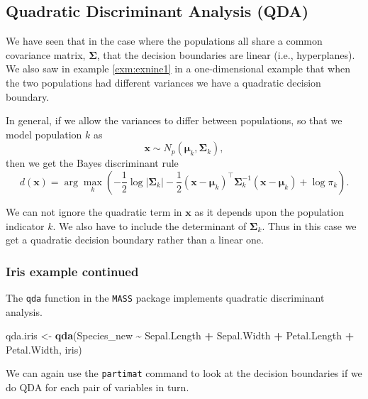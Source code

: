 \documentclass[
]{book}
\newenvironment{Shaded}{\begin{snugshade}}{\end{snugshade}}
\newcommand{\FunctionTok}[1]{\textcolor[rgb]{0.13,0.29,0.53}{\textbf{#1}}}
\newcommand{\NormalTok}[1]{#1}
\newcommand{\OtherTok}[1]{\textcolor[rgb]{0.56,0.35,0.01}{#1}}
\newcommand{\SpecialCharTok}[1]{\textcolor[rgb]{0.81,0.36,0.00}{\textbf{#1}}}
\theoremstyle{definition}
\theoremstyle{definition}
\theoremstyle{definition}
\theoremstyle{definition}
\theoremstyle{remark}
\begin{document}
\hypertarget{quadratic-discriminant-analysis-qda}{%
\subsection{Quadratic Discriminant Analysis (QDA)}\label{quadratic-discriminant-analysis-qda}}

We have seen that in the case where the populations all share a common covariance matrix, \(\boldsymbol{\Sigma}\), that the decision boundaries are linear (i.e., hyperplanes). We also saw in example \ref{exm:exnine1} in a one-dimensional example that when the two populations had different variances we have a quadratic decision boundary.

In general, if we allow the variances to differ between populations, so that we model population \(k\) as \[\mathbf x\sim N_p({\boldsymbol{\mu}}_k, \boldsymbol{\Sigma}_k),\]
then we get the Bayes discriminant rule
\[
d(\mathbf x)=\arg\max_k \left(-\frac{1}{2} \log |\boldsymbol{\Sigma}_k| - \frac{1}{2}(\mathbf x-{\boldsymbol{\mu}}_k)^\top \boldsymbol{\Sigma}_k^{-1} (\mathbf x-{\boldsymbol{\mu}}_k)+\log \pi_k\right). \]

We can not ignore the quadratic term in \(\mathbf x\) as it depends upon the population indicator \(k\). We also have to include the determinant of \(\boldsymbol{\Sigma}_k\). Thus in this case we get a quadratic decision boundary rather than a linear one.

\hypertarget{iris-example-continued}{%
\subsubsection{Iris example continued}\label{iris-example-continued}}

The \texttt{qda} function in the \texttt{MASS} package implements quadratic discriminant analysis.

\begin{Shaded}
\begin{Highlighting}[]
\NormalTok{qda.iris }\OtherTok{\textless{}{-}} \FunctionTok{qda}\NormalTok{(Species\_new }\SpecialCharTok{\textasciitilde{}}\NormalTok{ Sepal.Length }\SpecialCharTok{+}\NormalTok{ Sepal.Width }\SpecialCharTok{+}\NormalTok{ Petal.Length }
                \SpecialCharTok{+}\NormalTok{ Petal.Width, iris)}
\end{Highlighting}
\end{Shaded}

We can again use the \texttt{partimat} command to look at the decision boundaries if we do QDA for each pair of variables in turn.
\end{document}
